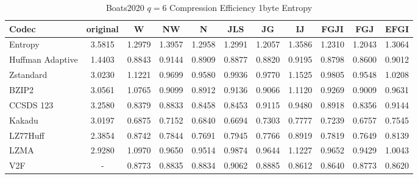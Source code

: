 \documentclass{article}
\begin{document}
\begin{table}[h!]
\centering
\caption{Boats2020 $q=6$ Compression Efficiency 1byte Entropy}
\begin{tabular}{|l|cccccccccc|}
\hline
Codec &  original &      W &     NW &      N &    JLS &     JG &     IJ &   FGJI &    FGJ &   EFGI \\
\hline
Entropy & 3.5815 & 1.2979 & 1.3957 & 1.2958 & 1.2991 & 1.2057 & 1.3586 & 1.2310 & 1.2043 & 1.3064 \\
\hline
Huffman Adaptive &    1.4403 & 0.8843 & 0.9144 & 0.8909 & 0.8877 & 0.8820 & 0.9195 & 0.8798 & 0.8600 & 0.9012 \\
Zstandard        &    3.0230 & 1.1221 & 0.9699 & 0.9580 & 0.9936 & 0.9770 & 1.1525 & 0.9805 & 0.9548 & 1.0208 \\
BZIP2            &    3.0561 & 1.0765 & 0.9099 & 0.8912 & 0.9136 & 0.9066 & 1.1120 & 0.9269 & 0.9009 & 0.9631 \\
CCSDS 123        &    3.2580 & 0.8379 & 0.8833 & 0.8458 & 0.8453 & 0.9115 & 0.9480 & 0.8918 & 0.8356 & 0.9144 \\
Kakadu           &    3.0197 & 0.6875 & 0.7152 & 0.6840 & 0.6694 & 0.7303 & 0.7777 & 0.7239 & 0.6757 & 0.7545 \\
LZ77Huff         &    2.3854 & 0.8742 & 0.7844 & 0.7691 & 0.7945 & 0.7766 & 0.8919 & 0.7819 & 0.7649 & 0.8139 \\
LZMA             &    2.9280 & 1.0970 & 0.9650 & 0.9514 & 0.9874 & 0.9644 & 1.1227 & 0.9652 & 0.9429 & 1.0043 \\
V2F              &    - & 0.8773 & 0.8835 & 0.8834 & 0.9062 & 0.8885 & 0.8612 & 0.8640 & 0.8773 & 0.8620 \\
\hline
\end{tabular}
\end{table}
\end{document}
